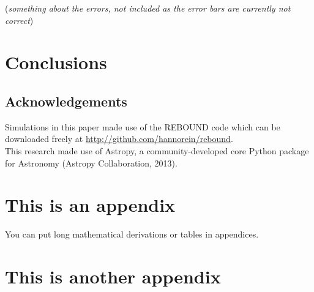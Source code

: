 \documentclass[12pt]{report}
\newcommand{\mnras}{MNRAS}
\newcommand{\aap}{A\&A}
\begin{document}
	(\textit{something about the errors, not included as the error bars are currently not correct})
\chapter{Conclusions}


\section*{Acknowledgements}

Simulations in this paper made use of the REBOUND code which can be downloaded freely at \url{http://github.com/hannorein/rebound}.\vspace{0.5cm}\\
This research made use of Astropy, a community-developed core Python package for Astronomy (Astropy Collaboration, 2013).

%




\begin{appendix}

\chapter{This is an appendix}
\label{ap:input_code}
You can put long mathematical derivations or tables in appendices.

\chapter{This is another appendix}

\end{appendix}
\end{document}
